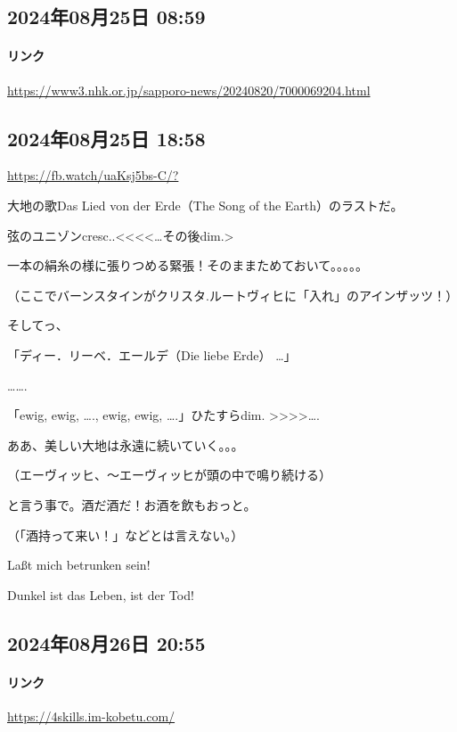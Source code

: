 \subsection*{2024年08月25日 08:59}

\paragraph{リンク}
\url{https://www3.nhk.or.jp/sapporo-news/20240820/7000069204.html}

\subsection*{2024年08月25日 18:58}

\url{https://fb.watch/uaKsj5bs-C/?}

大地の歌Das Lied von der Erde（The Song of the Earth）のラストだ。

弦のユニゾンcresc..<<<<…その後dim.>

一本の絹糸の様に張りつめる緊張！そのままためておいて。。。。。

（ここでバーンスタインがクリスタ.ルートヴィヒに「入れ」のアインザッツ！）

そしてっ、

「ディー．リーベ．エールデ（Die liebe Erde） …」

…….

「ewig, ewig, …., ewig, ewig, ….」ひたすらdim. >>>>….

ああ、美しい大地は永遠に続いていく。。。

（エーヴィッヒ、〜エーヴィッヒが頭の中で鳴り続ける）

と言う事で。酒だ酒だ！お酒を飲もおっと。

（「酒持って来い！」などとは言えない。）

Laßt mich betrunken sein!

Dunkel ist das Leben, ist der Tod!

\subsection*{2024年08月26日 20:55}

\paragraph{リンク}
\url{https://4skills.im-kobetu.com/}

